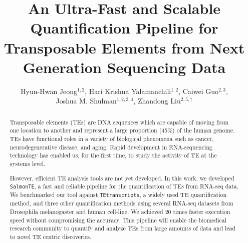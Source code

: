 \documentclass[wsdraft]{ws-procs11x85}
\newcommand{\TEtranscripts}{\texttt{TEtranscripts}}
\newcommand{\SalmonTE}{\texttt{SalmonTE}}
\begin{document}
\title{An Ultra-Fast and Scalable Quantification Pipeline for Transposable Elements from Next Generation Sequencing Data}

\author{Hyun-Hwan Jeong$^{1,2}$, Hari Krishna Yalamanchili$^{1,2}$, Caiwei Guo$^{2,3}$, \\
Joshua M. Shulman$^{1,2,3,4}$, Zhandong Liu$^{2,5,\dag}$}

\address{$^{1}$Department of Molecular and Human Genetics, Baylor College of Medicine,\\
$^{2}$Jan and Dan Duncan Neurological Research Institute, Texas Children’s Hospital,\\
$^{3}$Department of Neuroscience, Baylor College of Medicine,\\
$^{4}$Department of Neurology, Baylor College of Medicine,\\
$^{5}$Department of Pediatrics, Baylor College of Medicine,\\
Houston, Texas 77030, USA\\
$^{\dag}$E-mail: zhandonl@bcm.edu}

\begin{abstract}

Transposable elements (TEs) are DNA sequences which are capable of moving from one location to another and represent a large proportion (45\%) of the human genome. 
TEs have functional roles in a variety of biological phenomena such as cancer,
neurodegenerative disease, and aging.
Rapid development in RNA-sequencing technology has enabled us, for the first time, to study the activity of TE at the systems level.  


However, efficient TE analysis tools are not yet developed.
In this work, we developed \SalmonTE, a fast and reliable pipeline for the quantification of TEs from 
RNA-seq data.
We benchmarked our tool against \TEtranscripts, a widely used TE quantification method,  and three other quantification methods using several RNA-seq datasets from
Drosophila melanogaster and human cell-line.
We achieved 20 times faster execution speed without compromising the accuracy.
This pipeline will enable the biomedical research community to quantify and analyze TEs from large amounts of data and lead to novel TE centric discoveries.


\end{abstract}


\end{document}
